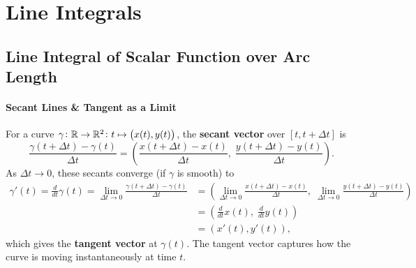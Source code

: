 \documentclass[11pt,openany]{article}
\renewcommand{\emph}[1]{\textbf{#1}}
\begin{document}
\newpage
\section*{Line Integrals}
\subsection*{Line Integral of Scalar Function over Arc Length}

\paragraph{Secant Lines \&  Tangent as a Limit}
\begin{center}
	\endanimateinline
\end{center}
For a curve $\gamma\colon\mathbb{R}\to\mathbb{R}^2\colon t\mapsto\bigl(x(t),y(t)\bigr)$, the \emph{secant vector} over $[t,t+\Delta t]$ is
\[
\frac{\gamma(t+\Delta t)-\gamma(t)}{\Delta t}
= \left(\frac{x(t+\Delta t)-x(t)}{\Delta t},\;\frac{y(t+\Delta t)-y(t)}{\Delta t}\right).
\]
As $\Delta t \to 0$, these secants converge (if $\gamma$ is smooth) to \begin{align*}
\gamma'(t)=\frac{d}{dt}\gamma(t)= \lim_{\Delta t\to0}
\frac{\gamma(t+\Delta t)-\gamma(t)}{\Delta t}&=\left(\lim_{\Delta t\to0}\frac{x(t+\Delta t)-x(t)}{\Delta t},\;\lim_{\Delta t\to0}\frac{y(t+\Delta t)-y(t)}{\Delta t}\right)\\
&=\left(\frac{d}{dt}x(t),\;\frac{d}{dt}y(t)\right)\\
&=(x'(t),y'(t)),
\end{align*} which gives the \emph{tangent vector} at $\gamma(t)$. The tangent vector captures how the curve is moving instantaneously at time $t$.\par
\end{document}
